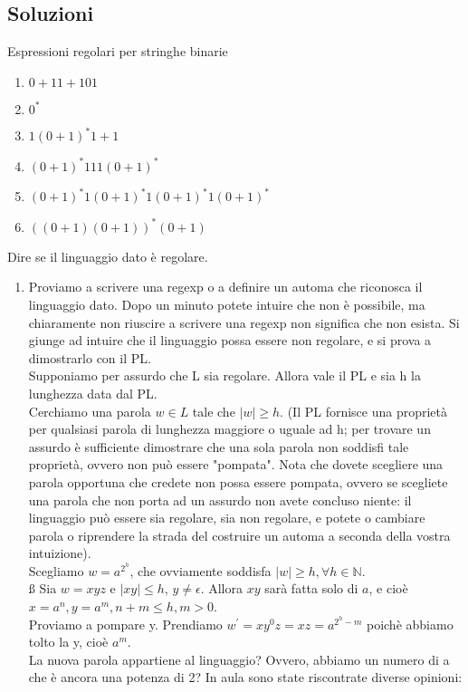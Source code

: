 \documentclass[a4paper,11pt]{article}
\begin{document}
    \subsection{Soluzioni}
    Espressioni regolari per stringhe binarie
    \begin{enumerate}
        \item $ 0+11+101 $
        \item $ 0^* $
        \item $1(0+1)^*1+1$
        \item $(0+1)^*111(0+1)^*$
        \item $(0+1)^*1(0 + 1)^*1(0 + 1)^*1(0 + 1)^*$
        \item $((0+1)(0+1))^*(0+1)$
    \end{enumerate}
    Dire se il linguaggio dato è regolare.
    \begin{enumerate}
        \item Proviamo a scrivere una regexp o a definire un automa che riconosca il linguaggio dato. Dopo un minuto potete intuire che non è possibile, ma chiaramente non riuscire a scrivere una regexp non significa che non esista. Si giunge ad intuire che il linguaggio possa essere non regolare, e si prova a dimostrarlo con il PL.\\
        Supponiamo per assurdo che L sia regolare. Allora vale il PL e sia h la lunghezza data dal PL.\\
        Cerchiamo una parola $w\in L$ tale che $|w|\geq h$. (Il PL fornisce una proprietà per qualsiasi parola di lunghezza maggiore o uguale ad h; per trovare un assurdo è sufficiente dimostrare che una sola parola non soddisfi tale proprietà, ovvero non può essere "pompata". Nota che dovete scegliere una parola opportuna che credete non possa essere pompata, ovvero se scegliete una parola che non porta ad un assurdo non avete concluso niente: il linguaggio può essere sia regolare, sia non regolare, e potete o cambiare parola o riprendere la strada del costruire un automa a seconda della vostra intuizione).\\
        Scegliamo $w=a^{2^h}$, che ovviamente soddisfa $|w|\geq h, \forall h \in \mathbb{N}$.\\ß
        Sia $w=xyz$ e $|xy|\leq h$, $y\neq\epsilon$. Allora $xy$ sarà fatta solo di $a$, e cioè $x=a^n, y=a^m, n+m\leq h, m>0$.\\
        Proviamo a pompare y. Prendiamo $w^{'}=xy^0z=xz=a^{2^h-m}$ poichè abbiamo tolto la y, cioè $a^m$.\\
        La nuova parola appartiene al linguaggio? Ovvero, abbiamo un numero di a che è ancora una potenza di 2? In aula sono state riscontrate diverse opinioni:

\end{enumerate}
\end{document}
